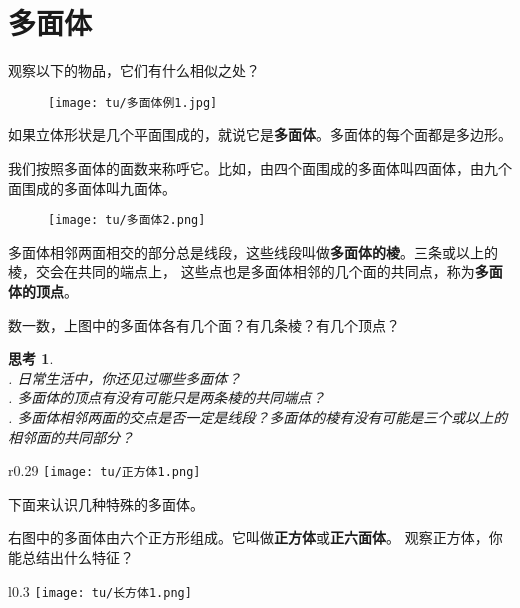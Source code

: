 \documentclass[12pt,UTF8]{ctexbook}
\theoremstyle{definition}
\theoremstyle{plain}
\newtheorem{sk}{思考}[section]
\begin{document}
\section{多面体}
观察以下的物品，它们有什么相似之处？

\begin{figure}[h] %
    \vspace{4pt}
    \centering
    \texttt{[image: tu/多面体例1.jpg]}
\end{figure}

如果立体形状是几个平面围成的，就说它是\textbf{多面体}。多面体的每个面都是多边形。

我们按照多面体的面数来称呼它。比如，由四个面围成的多面体叫四面体，由九个面围成的多面体叫九面体。

\begin{figure}[h] %
    \vspace{4pt}
    \centering
    \texttt{[image: tu/多面体2.png]}
\end{figure}

多面体相邻两面相交的部分总是线段，这些线段叫做\textbf{多面体的棱}。三条或以上的棱，交会在共同的端点上，
这些点也是多面体相邻的几个面的共同点，称为\textbf{多面体的顶点}。

数一数，上图中的多面体各有几个面？有几条棱？有几个顶点？

\begin{sk}
    \mbox{}\\
    . 日常生活中，你还见过哪些多面体？\\
    . 多面体的顶点有没有可能只是两条棱的共同端点？\\
    . 多面体相邻两面的交点是否一定是线段？多面体的棱有没有可能是三个或以上的相邻面的共同部分？    
\end{sk}

\begin{wrapfigure}[3]{r}{0.29\textwidth} %
    \vspace{-50pt}
    \flushright
    \texttt{[image: tu/正方体1.png]}
\end{wrapfigure}

下面来认识几种特殊的多面体。

右图中的多面体由六个正方形组成。它叫做\textbf{正方体}或\textbf{正六面体}。
观察正方体，你能总结出什么特征？

\begin{wrapfigure}[4]{l}{0.3\textwidth} %
    \vspace{-20pt}
    \flushright
    \texttt{[image: tu/长方体1.png]}
\end{wrapfigure}
\end{document}

